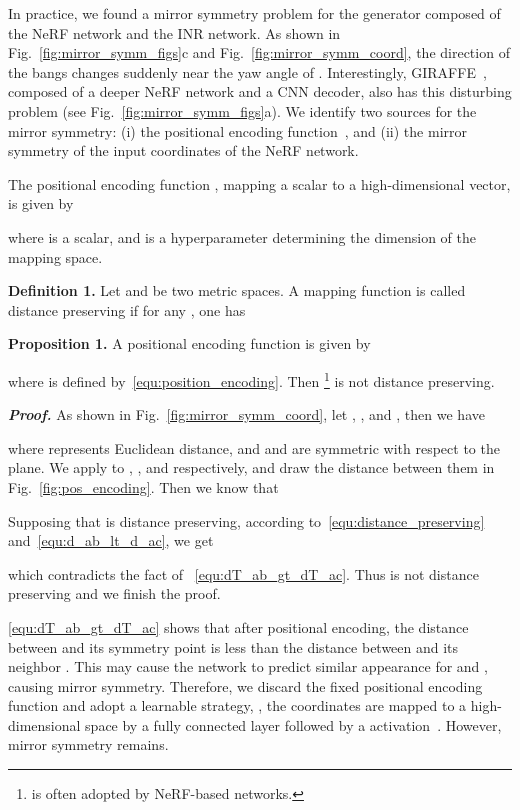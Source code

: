 \documentclass[10pt,twocolumn,letterpaper]{article}
\begin{document}
In practice, we found a mirror symmetry problem for the generator composed of the NeRF network and the INR network. As shown in Fig.~\ref{fig:mirror_symm_figs}c and Fig.~\ref{fig:mirror_symm_coord}, the direction of the bangs changes suddenly near the yaw angle of . Interestingly, GIRAFFE~\cite{niemeyer2021GIRAFFE}, composed of a deeper NeRF network and a CNN decoder, also has this disturbing problem (see Fig.~\ref{fig:mirror_symm_figs}a). We identify two sources for the mirror symmetry: (i) the positional encoding function~\cite{mildenhall2020NeRF}, and (ii) the mirror symmetry of the input coordinates of the NeRF network.

The positional encoding function , mapping a scalar to a high-dimensional vector, is given by

where  is a scalar, and  is a hyperparameter determining the dimension of the mapping space.


\textbf{Definition 1.}
Let  and  be two metric spaces. A mapping function  is called distance preserving if for any , one has



\textbf{Proposition 1.} A positional encoding function  is given by

where  is defined by~\cref{equ:position_encoding}. Then  \footnote{ is often adopted by NeRF-based networks.} is not distance preserving.

\textit{\textbf{Proof.}}\quad
As shown in Fig.~\ref{fig:mirror_symm_coord}, let , , and , then we have

where  represents Euclidean distance, and  and  are symmetric with respect to the  plane. We apply  to , , and  respectively, and draw the distance between them in Fig.~\ref{fig:pos_encoding}. Then we know that

Supposing that  is distance preserving, according to~\cref{equ:distance_preserving} and~\cref{equ:d_ab_lt_d_ac}, we get

which contradicts the fact of ~\cref{equ:dT_ab_gt_dT_ac}. Thus  is not distance preserving and we finish the proof.
\hfill

\cref{equ:dT_ab_gt_dT_ac} shows that after positional encoding, the distance between  and its symmetry point  is less than the distance between  and its neighbor . This may cause the network to predict similar appearance for  and , causing mirror symmetry. Therefore, we discard the fixed positional encoding function and adopt a learnable strategy, \ie, the coordinates  are mapped to a high-dimensional space by a fully connected layer followed by a  activation~\cite{sitzmann2020Implicit}. However, mirror symmetry remains.
\end{document}
